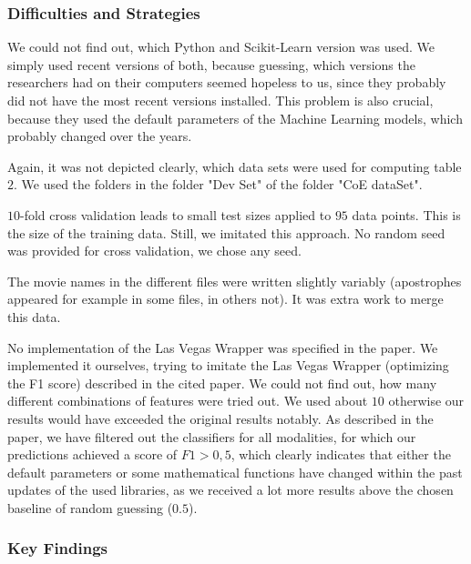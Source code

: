 \subsubsection*{Difficulties and Strategies}
We could not find out, which Python and Scikit-Learn version was used. We simply used recent versions of both, because guessing, which versions the researchers had on their computers seemed hopeless to us, since they probably did not have the most recent versions installed. This problem is also crucial, because they used the default parameters of the Machine Learning models, which probably changed over the years. 

Again, it was not depicted clearly, which data sets were used for computing table $2$. We used the folders in the folder "Dev Set" of the folder "CoE dataSet". 

$10$-fold cross validation leads to small test sizes applied to $95$ data points. This is the size of the training data. Still, we imitated this approach. No random seed was provided for cross validation, we chose any seed. 

The movie names in the different files were written slightly variably (apostrophes appeared for example in some files, in others not). It was extra work to merge this data. 

No implementation of the Las Vegas Wrapper was specified in the paper. We implemented it ourselves, trying to imitate the Las Vegas Wrapper (optimizing the F1 score) described in the cited paper. We could not find out, how many different combinations of features were tried out. We used about $10$ otherwise our results would have exceeded the original results notably. 
As described in the paper, we have filtered out the classifiers for all modalities, for which our predictions achieved a score of $F1>0,5$, which clearly indicates that either the default parameters or some mathematical functions have changed within the past updates of the used libraries, as we received a lot more results above the chosen baseline of random guessing ($0.5$).



\subsubsection*{Key Findings}